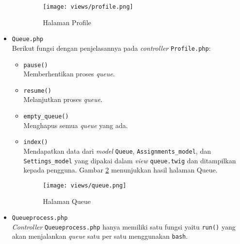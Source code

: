 \begin{itemize}
\begin{itemize}
                        \begin{figure}[H]
                              \centering
                              \texttt{[image: views/profile.png]}
                              \caption{Halaman Profile}
                              \label{fig:3:1:1:profile}
                        \end{figure}

            \end{itemize}

      \item \verb|Queue.php| \\
            Berikut fungsi dengan penjelasannya pada \textit{controller} \verb|Profile.php|:

            \begin{itemize}
                  \item \verb|pause()| \\
                        Memberhentikan proses \textit{queue}.
                  \item \verb|resume()| \\
                        Melanjutkan proses \textit{queue}.
                  \item \verb|empty_queue()| \\
                        Menghapus semua \textit{queue} yang ada.
                  \item \verb|index()| \\
                        Mendapatkan data dari \textit{model} \verb|Queue|, \verb|Assignments_model|, dan \verb|Settings_model| yang dipakai dalam \textit{view} \verb|queue.twig| dan ditampilkan kepada pengguna. Gambar \ref{fig:3:1:1:queue} menunjukkan hasil halaman Queue.

                        \begin{figure}[H]
                              \centering
                              \texttt{[image: views/queue.png]}
                              \caption{Halaman Queue}
                              \label{fig:3:1:1:queue}
                        \end{figure}

            \end{itemize}

      \item \verb|Queueprocess.php| \\
            \textit{Controller} \verb|Queueprocess.php| hanya memiliki satu fungsi yaitu \verb|run()| yang akan menjalankan \textit{queue} satu per satu menggunakan \verb|bash|.


\end{itemize}

